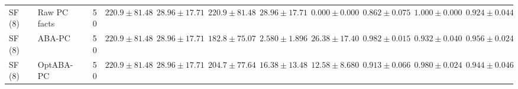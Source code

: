 \begin{table}[t]
{\begin{tabular}{llrcccccccc}
\midrule
SF (8) & Raw PC facts & 50 & $220.9\pm81.48$ & $28.96\pm17.71$ & $220.9\pm81.48$ & $28.96\pm17.71$ & $0.000\pm0.000$ & $0.862\pm0.075$ & $1.000\pm0.000$ & $0.924\pm0.044$\\
SF (8) & ABA-PC & 50 & $220.9\pm81.48$ & $28.96\pm17.71$ & $182.8\pm75.07$ & $2.580\pm1.896$ & $26.38\pm17.40$ & $0.982\pm0.015$ & $0.932\pm0.040$ & $0.956\pm0.024$\\
SF (8) & OptABA-PC & 50 & $220.9\pm81.48$ & $28.96\pm17.71$ & $204.7\pm77.64$ & $16.38\pm13.48$ & $12.58\pm8.680$ & $0.913\pm0.066$ & $0.980\pm0.024$ & $0.944\pm0.046$\\
\bottomrule
\end{tabular}%
}
\end{table}
